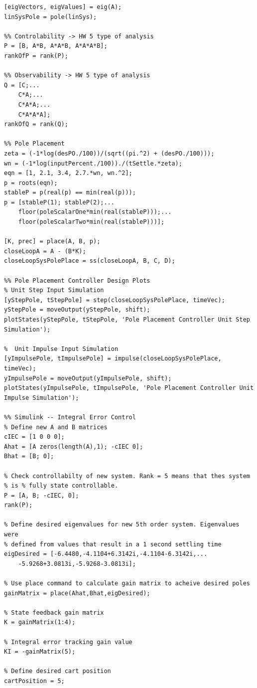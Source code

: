 \documentclass[titlepage]{article}
\begin{document}
\begin{lstlisting}[style=Matlab-editor]
%% Stability -> HW 4 type of analysis
[eigVectors, eigValues] = eig(A);
linSysPole = pole(linSys);

%% Controlability -> HW 5 type of analysis
P = [B, A*B, A*A*B, A*A*A*B];
rankOfP = rank(P);

%% Observability -> HW 5 type of analysis
Q = [C;...
    C*A;...
    C*A*A;...
    C*A*A*A];
rankOfQ = rank(Q);

%% Pole Placement
zeta = (-1*log(desPO./100))/(sqrt((pi.^2) + (desPO./100)));
wn = (-1*log(inputPercent./100))./(tSettle.*zeta);
eqn = [1, 2.1, 3.4, 2.7.*wn, wn.^2];
p = roots(eqn);
stableP = p(real(p) == min(real(p)));
p = [stableP(1); stableP(2);...
    floor(poleScalarOne*min(real(stableP)));...
    floor(poleScalarTwo*min(real(stableP)))];

[K, prec] = place(A, B, p);
closeLoopA = A - (B*K);
closeLoopSysPolePlace = ss(closeLoopA, B, C, D);

%% Pole Placement Controller Design Plots
% Unit Step Input Simulation
[yStepPole, tStepPole] = step(closeLoopSysPolePlace, timeVec);
yStepPole = moveOutput(yStepPole, shift);
plotStates(yStepPole, tStepPole, 'Pole Placement Controller Unit Step Simulation');

%  Unit Impulse Input Simulation
[yImpulsePole, tImpulsePole] = impulse(closeLoopSysPolePlace, timeVec);
yImpulsePole = moveOutput(yImpulsePole, shift);
plotStates(yImpulsePole, tImpulsePole, 'Pole Placement Controller Unit Impulse Simulation');

%% Simulink -- Integral Error Control
% Define new A and B matrices
cIEC = [1 0 0 0];
Ahat = [A zeros(length(A),1); -cIEC 0];
Bhat = [B; 0];

% Check controllabilty of new system. Rank = 5 means that thes system
% is % fully state controllable.
P = [A, B; -cIEC, 0];
rank(P);

% Define desired eigenvalues for new 5th order system. Eigenvalues were
% defined from values that result in a 1 second settling time
eigDesired = [-6.4480,-4.1104+6.3142i,-4.1104-6.3142i,...
    -5.9268+3.0813i,-5.9268-3.0813i];

% Use place command to calculate gain matrix to acheive desired poles
gainMatrix = place(Ahat,Bhat,eigDesired);

% State feedback gain matrix
K = gainMatrix(1:4);

% Integral error tracking gain value
KI = -gainMatrix(5);

% Define desired cart position
cartPosition = 5;


\end{lstlisting}
\end{document}
